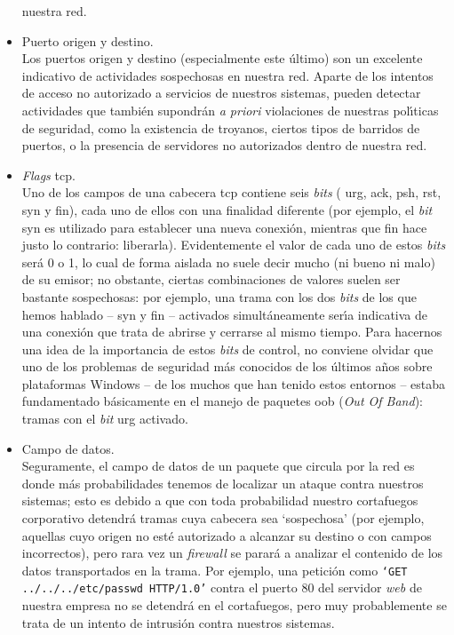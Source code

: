 \begin{itemize}
nuestra red.
\item Puerto origen y destino.\\
Los puertos origen y destino (especialmente este \'ultimo) son un excelente
indicativo de actividades sospechosas en nuestra red. Aparte de los intentos de
acceso no autorizado a servicios de nuestros sistemas, pueden detectar 
actividades que tambi\'en supondr\'an {\it a priori} violaciones de nuestras 
pol\'{\i}ticas de seguridad, como la existencia de troyanos, ciertos tipos de
barridos de puertos, o la presencia de servidores no autorizados dentro de 
nuestra red.
\item {\it Flags} {\sc tcp}.\\
Uno de los campos de una cabecera {\sc tcp} contiene seis {\it bits} ({\sc 
urg}, {\sc ack}, {\sc psh}, {\sc rst}, {\sc syn} y {\sc fin}), cada uno de 
ellos con una finalidad diferente (por ejemplo, el {\it bit} {\sc syn} es 
utilizado para establecer una nueva conexi\'on, mientras que {\sc fin} hace 
justo lo contrario: liberarla). Evidentemente el valor de cada uno de estos 
{\it bits} ser\'a 0 o 1, lo cual de forma aislada no suele decir mucho (ni 
bueno ni malo) de su emisor; no obstante, ciertas combinaciones de valores 
suelen ser bastante sospechosas: por ejemplo, una trama con los dos {\it bits} 
de los que hemos hablado -- {\sc syn} y {\sc fin} -- activados 
simult\'aneamente ser\'{\i}a indicativa de una conexi\'on que trata de abrirse 
y cerrarse al mismo tiempo. Para hacernos una idea de la importancia de estos
{\it bits} de control, no conviene olvidar que uno de los problemas de
seguridad m\'as conocidos de los \'ultimos a\~nos sobre plataformas Windows --
de los muchos que han tenido estos entornos -- estaba fundamentado b\'asicamente
en el manejo de paquetes {\sc oob} ({\it Out Of Band}): tramas con el {\it bit} 
{\sc urg} activado.
\item Campo de datos.\\
Seguramente, el campo de datos de un paquete que circula por la red es 
donde m\'as probabilidades tenemos de localizar un ataque contra nuestros 
sistemas; esto es debido a que con toda probabilidad nuestro cortafuegos
corporativo detendr\'a tramas cuya cabecera sea `sospechosa' (por ejemplo, 
aquellas cuyo origen no est\'e autorizado a alcanzar su destino o con campos
incorrectos), pero rara vez un {\it firewall} se parar\'a a analizar el 
contenido de los datos transportados en la trama. Por ejemplo, una petici\'on 
como {\tt `GET ../../../etc/passwd HTTP/1.0'} contra el puerto 80 del servidor 
{\it web} de nuestra empresa no se detendr\'a en el cortafuegos, pero muy
probablemente se trata de un intento de intrusi\'on contra nuestros sistemas.
\end{itemize}
